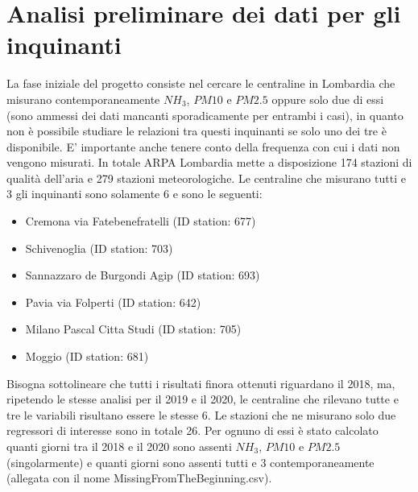 \documentclass{article}
\begin{document}
\section{Analisi preliminare dei dati per gli inquinanti}
La fase iniziale del progetto consiste nel cercare le centraline in Lombardia
che misurano contemporaneamente $NH_{3}$, $PM10$ e $PM2.5$ oppure solo due di essi
(sono ammessi dei dati mancanti sporadicamente per entrambi i casi), in quanto non è possibile
studiare le relazioni tra questi inquinanti se solo uno dei tre è disponibile.
E' importante anche tenere conto della frequenza con cui i dati non vengono misurati.
In totale ARPA Lombardia mette a disposizione 174 stazioni di qualità dell'aria e 279 stazioni 
meteorologiche.
Le centraline che misurano tutti e 3 gli inquinanti sono solamente 6 e sono le seguenti:
\begin{itemize}
    \item Cremona via Fatebenefratelli (ID station: 677)
    \item Schivenoglia (ID station: 703)
    \item Sannazzaro de Burgondi Agip (ID station: 693)
    \item Pavia via Folperti (ID station: 642)
    \item Milano Pascal Citta Studi (ID station: 705)
    \item Moggio (ID station: 681)
\end{itemize}
Bisogna sottolineare che tutti i risultati finora ottenuti riguardano il 2018, ma, ripetendo le stesse analisi per il 2019 e il 2020, 
le centraline che rilevano tutte e tre le variabili risultano essere le stesse 6.
Le stazioni che ne misurano solo due regressori di interesse sono in totale 26.
Per ognuno di essi è stato calcolato quanti giorni tra il 2018 e il 2020 sono assenti
$NH_{3}$, $PM10$ e $PM2.5$ (singolarmente) e quanti giorni sono assenti tutti e 3 contemporaneamente
(allegata con il nome MissingFromTheBeginning.csv). 
\end{document}
